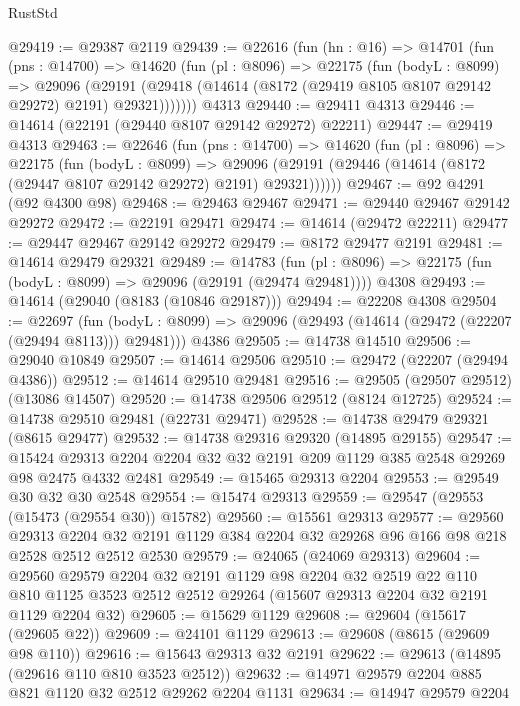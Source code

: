 \begin{lexlean}{RustStd}
\begin{coremodule}
@29419 := @29387 @2119
@29439 := @22616
    (fun (hn : @16) =>
    @14701
      (fun (pns : @14700) =>
      @14620
        (fun (pl : @8096) =>
        @22175
          (fun (bodyL : @8099) =>
          @29096
            (@29191 (@29418 (@14614 (@8172 (@29419 @8105 @8107 @29142 @29272) @2191) @29321)))))))
    @4313
@29440 := @29411 @4313
@29446 := @14614 (@22191 (@29440 @8107 @29142 @29272) @22211)
@29447 := @29419 @4313
@29463 := @22646
    (fun (pns : @14700) =>
    @14620
      (fun (pl : @8096) =>
      @22175
        (fun (bodyL : @8099) =>
        @29096 (@29191 (@29446 (@14614 (@8172 (@29447 @8107 @29142 @29272) @2191) @29321))))))
@29467 := @92 @4291 (@92 @4300 @98)
@29468 := @29463 @29467
@29471 := @29440 @29467 @29142 @29272
@29472 := @22191 @29471
@29474 := @14614 (@29472 @22211)
@29477 := @29447 @29467 @29142 @29272
@29479 := @8172 @29477 @2191
@29481 := @14614 @29479 @29321
@29489 := @14783
    (fun (pl : @8096) => @22175 (fun (bodyL : @8099) => @29096 (@29191 (@29474 @29481))))
    @4308
@29493 := @14614 (@29040 (@8183 (@10846 @29187)))
@29494 := @22208 @4308
@29504 := @22697
    (fun (bodyL : @8099) => @29096 (@29493 (@14614 (@29472 (@22207 (@29494 @8113))) @29481)))
    @4386
@29505 := @14738 @14510
@29506 := @29040 @10849
@29507 := @14614 @29506
@29510 := @29472 (@22207 (@29494 @4386))
@29512 := @14614 @29510 @29481
@29516 := @29505 (@29507 @29512) (@13086 @14507)
@29520 := @14738 @29506 @29512 (@8124 @12725)
@29524 := @14738 @29510 @29481 (@22731 @29471)
@29528 := @14738 @29479 @29321 (@8615 @29477)
@29532 := @14738 @29316 @29320 (@14895 @29155)
@29547 := @15424 @29313 @2204 @2204 @32 @32 @2191 @209 @1129 @385 @2548 @29269 @98 @2475 @4332 @2481
@29549 := @15465 @29313 @2204
@29553 := @29549 @30 @32 @30 @2548
@29554 := @15474 @29313
@29559 := @29547 (@29553 (@15473 (@29554 @30)) @15782)
@29560 := @15561 @29313
@29577 := @29560
    @29313
    @2204
    @32
    @2191
    @1129
    @384
    @2204
    @32
    @29268
    @96
    @166
    @98
    @218
    @2528
    @2512
    @2512
    @2530
@29579 := @24065 (@24069 @29313)
@29604 := @29560
    @29579
    @2204
    @32
    @2191
    @1129
    @98
    @2204
    @32
    @2519
    @22
    @110
    @810
    @1125
    @3523
    @2512
    @2512
    @29264
    (@15607 @29313 @2204 @32 @2191 @1129 @2204 @32)
@29605 := @15629 @1129
@29608 := @29604 (@15617 (@29605 @22))
@29609 := @24101 @1129
@29613 := @29608 (@8615 (@29609 @98 @110))
@29616 := @15643 @29313 @32 @2191
@29622 := @29613 (@14895 (@29616 @110 @810 @3523 @2512))
@29632 := @14971 @29579 @2204 @885 @821 @1120 @32 @2512 @29262 @2204 @1131
@29634 := @14947 @29579 @2204

\end{coremodule}
\end{lexlean}
